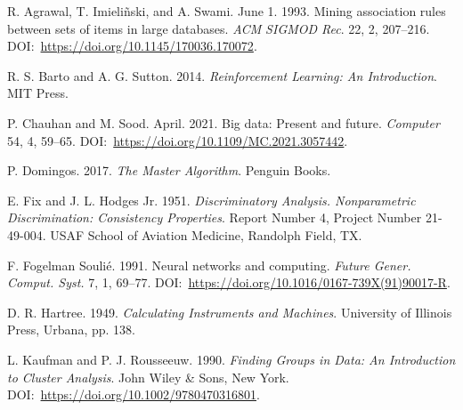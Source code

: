 \begin{thebibliography}{}

 R. Agrawal, T. Imieli\~{n}ski, and A. Swami. June 1. 1993. Mining association rules between sets of items in large databases. \textit{ACM} \textit{SIGMOD Rec}. 22, 2, 207--216. DOI:~\href{https://doi.org/10.1145/170036.170072}{https://{\allowbreak}doi.{\allowbreak}org/{\allowbreak}10.{\allowbreak}1145/{\allowbreak}170036.{\allowbreak}170072}.

 R. S. Barto and A. G. Sutton. 2014. \textit{Reinforcement Learning: An Introduction}. MIT Press.

 P. Chauhan and M. Sood. April. 2021. Big data: Present and future. \textit{Computer} 54, 4, 59--65. DOI:~\href{https://doi.org/10.1109/MC.2021.3057442}{https://{\allowbreak}doi.{\allowbreak}org/{\allowbreak}10.{\allowbreak}1109/{\allowbreak}MC.{\allowbreak}2021.{\allowbreak}3057442}.

 P. Domingos. 2017. \textit{The Master Algorithm}. Penguin Books.

 E. Fix and J. L. Hodges Jr. 1951. \textit{Discriminatory Analysis. Nonparametric Discrimination: Consistency Properties}. Report Number 4, Project Number 21-49-004. USAF School of Aviation Medicine, Randolph Field, TX.

 F. Fogelman Souli\'{e}. 1991. Neural networks and computing. \textit{Future Gener. Comput. Syst.} 7, 1, 69--77. DOI:~\href{https://doi.org/10.1016/0167-739X(91)90017-R}{https://{\allowbreak}doi.{\allowbreak}org/{\allowbreak}10.{\allowbreak}1016/{\allowbreak}0167-{\allowbreak}739X{\allowbreak}(91){\allowbreak}90017-R}.

 D. R. Hartree. 1949. \textit{Calculating Instruments and Machines}. University of Illinois Press, Urbana, pp. 138.

 L. Kaufman and P. J. Rousseeuw. 1990. \textit{Finding Groups in Data: An Introduction to Cluster Analysis}. John Wiley \& Sons, New York. DOI:~\href{https://doi.org/10.1002/9780470316801}{https://{\allowbreak}doi.{\allowbreak}org/{\allowbreak}10.{\allowbreak}1002/{\allowbreak}9780470316801}.


\end{thebibliography}
